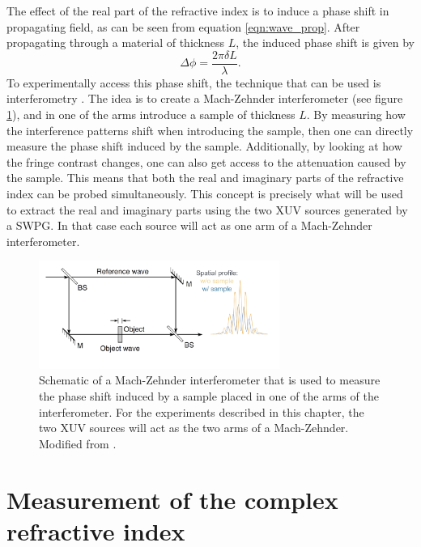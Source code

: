 The effect of the real part of the refractive index is to induce a phase shift in propagating field, as can be seen from equation \ref{eqn:wave_prop}.  After propagating through a material of thickness $L$, the induced phase shift is given by
\begin{equation}
\label{eqn:phase_shift}
	\Delta\phi=\frac{2\pi\delta L}{\lambda}.
\end{equation}
To experimentally access this phase shift, the technique that can be used is interferometry \cite{hemmersDirectMeasurementComplex2012, hemmersMulticolorXUVInterferometry2009, wilsonDoubleSlitInterferometry2012}. The idea is to create a Mach-Zehnder interferometer (see figure \ref{fig:mach-zehnder_interferometer}), and in one of the arms introduce a sample of thickness $L$. By measuring how the interference patterns shift when introducing the sample, then one can directly measure the phase shift induced by the sample.  Additionally, by looking at how the fringe contrast changes, one can also get access to the attenuation caused by the sample.  This means that both the real and imaginary parts of the refractive index can be probed simultaneously.  This concept is precisely what will be used to extract the real and imaginary parts using the two XUV sources generated by a SWPG.  In that case each source will act as one arm of a Mach-Zehnder interferometer.
\begin{figure}
	\centering
	\includegraphics[width=0.7\textwidth]{figures/refractive_index/mach_zehnder_phase_shift.png}
	\caption{Schematic of a Mach-Zehnder interferometer that is used to measure the phase shift induced by a sample placed in one of the arms of the interferometer.  For the experiments described in this chapter, the two XUV sources will act as the two arms of a Mach-Zehnder.  Modified from \cite{attwoodSoftXraysExtreme2000}.}
	\label{fig:mach-zehnder_interferometer}
\end{figure}

\section{Measurement of the complex refractive index}
